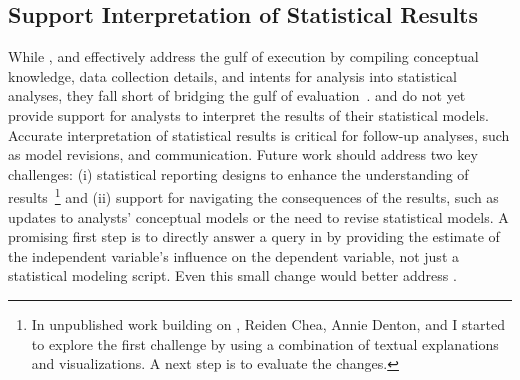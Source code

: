 \subsection{Support Interpretation of Statistical Results}
While \tea, \tisane and \rTisane effectively address the gulf of execution by
compiling conceptual knowledge, data collection details, and intents for
analysis into statistical analyses, they fall short of bridging the gulf of
evaluation~\cite{norman2013doet}. \tisane and \rTisane do not yet provide
support for analysts to interpret the results of their statistical models.
Accurate interpretation of statistical results is critical for follow-up
analyses, such as model revisions, and communication. Future work should address
two key challenges: (i) statistical reporting designs to enhance the
understanding of results~\footnote{In unpublished work building on \tea, Reiden
Chea, Annie Denton, and I started to explore the first challenge by using a
combination of textual explanations and visualizations. A next step is to
evaluate the changes.} and (ii) support for navigating the consequences of the
results, such as updates to analysts' conceptual models or the need to revise
statistical models. A promising first step is to directly answer a query in
\rTisane by providing the estimate of the independent variable's influence on
the dependent variable, not just a statistical modeling script. Even this small
change would better address \thesisChallengeUnderstanding. 

\begin{comment}
Tisane's focus is on authoring GLMs/GLMMs, but accurate interpretation is also necessary. For instance, analysts may need
help interpreting what their statistical models and results mean in relation to
their input conceptual models. Do the results suggest their conceptual model is
correct? What kind of inferences should they make? Future work should address
these interpretation challenges, which may require eliciting hypotheses and expected results from analysts.

Although researchers in our pilot or case studies did not presume
Tisane helped with formal causal analysis, the ability to express causal
relationships (\texttt{causes}) may lead some analysts to erroneously assume
that their models assess causality. Changing the name of the language construct
and/or building out support to interpret GLM/GLMM results may resolve this concern. One way to support accurate interpretation and reporting could be to
output a figure representing the input conceptual model along with visual
summaries of the data and/or statistical model for direct inclusion in publications. 
Tisane could also allow analysts to annotate their disambiguation decisions with
their own rationale and provide a richer log of selections than currently
supported. Tisane could even accept these augmented logs to save the state of the GUI in between analysis sessions.
\end{comment}


